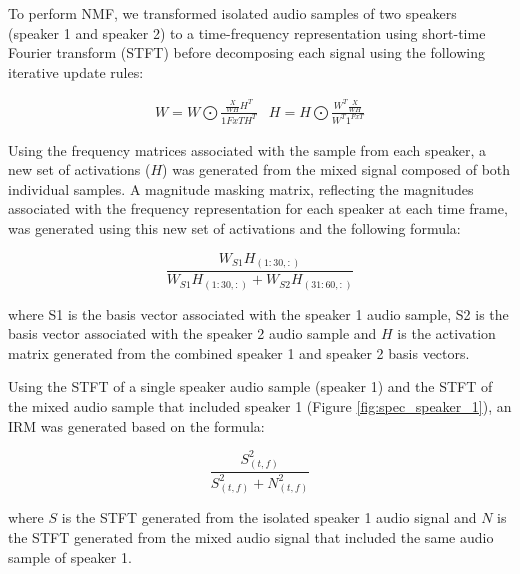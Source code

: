 \documentclass[journal, a4paper]{IEEEtran}
\begin{document}
To perform NMF, we transformed isolated audio samples of two speakers (speaker 1 and speaker 2) to a time-frequency representation using short-time Fourier transform (STFT) before decomposing each signal using the following iterative update rules:

\begin{equation}
\begin{array}{ll}
W = W \bigodot \frac{\frac{X}{WH}H^T}{1{FxT}H^T} &
H = H \bigodot \frac{W^T\frac{X}{WH}}{W^T1^{FxT}}
\end{array}
\end{equation}

Using the frequency matrices associated with the sample from each speaker, a new set of activations ($H$) was generated from the mixed signal composed of both individual samples. A magnitude masking matrix, reflecting the magnitudes associated with the frequency representation for each speaker at each time frame, was generated using this new set of activations and the following formula:

\begin{equation}
\dfrac{W_{S1}H_{(1:30,:)}}
{W_{S1}H_{(1:30,:)}+W_{S2}H_{(31:60,:)}}
\end{equation}

\begin{flushleft}
where S1 is the basis vector associated with the speaker 1 audio sample, S2 is the basis vector associated with the speaker 2 audio sample and $H$ is the activation matrix generated from the combined speaker 1 and speaker 2 basis vectors.\cite{ClassNMF}
\end{flushleft}

Using the STFT of a single speaker audio sample (speaker 1) and the STFT of the mixed audio sample that included speaker 1 (Figure \ref{fig:spec_speaker_1}), an IRM was generated based on the formula:

\begin{equation}
\dfrac{S_{(t,f)}^2}{S_{(t,f)}^2 + N_{(t,f)}^2}
\end{equation}

\begin{flushleft}

where $S$ is the STFT generated from the isolated speaker 1 audio signal and $N$ is the STFT generated from the mixed audio signal that included the same audio sample of speaker 1.\cite{DBLP:journals/corr/abs-1708-07524}

\end{flushleft}
\end{document}
